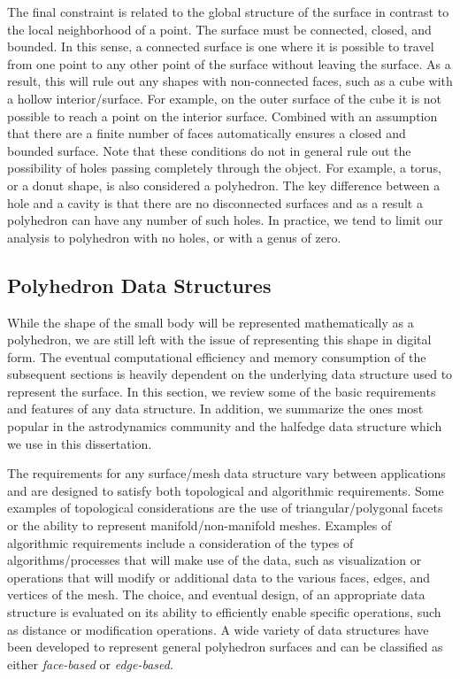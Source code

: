 The final constraint is related to the global structure of the surface in contrast to the local neighborhood of a point.
The surface must be connected, closed, and bounded.
In this sense, a connected surface is one where it is possible to travel from one point to any other point of the surface without leaving the surface. 
As a result, this will rule out any shapes with non-connected faces, such as a cube with a hollow interior/surface.
For example, on the outer surface of the cube it is not possible to reach a point on the interior surface. 
Combined with an assumption that there are a finite number of faces automatically ensures a closed and bounded surface. 
Note that these conditions do not in general rule out the possibility of holes passing completely through the object.
For example, a torus, or a donut shape, is also considered a polyhedron.
The key difference between a hole and a cavity is that there are no disconnected surfaces and as a result a polyhedron can have any number of such holes. 
In practice, we tend to limit our analysis to polyhedron with no holes, or with a genus of zero.

\subsection{Polyhedron Data Structures}\label{sec:polyhedron_data_structures}
While the shape of the small body will be represented mathematically as a polyhedron, we are still left with the issue of representing this shape in digital form. 
The eventual computational efficiency and memory consumption of the subsequent sections is heavily dependent on the underlying data structure used to represent the surface.
In this section, we review some of the basic requirements and features of any data structure.
In addition, we summarize the ones most popular in the astrodynamics community and the halfedge data structure which we use in this dissertation.

The requirements for any surface/mesh data structure vary between applications and are designed to satisfy both topological and algorithmic requirements.
Some examples of topological considerations are the use of triangular/polygonal facets or the ability to represent manifold/non-manifold meshes.
Examples of algorithmic requirements include a consideration of the types of algorithms/processes that will make use of the data, such as visualization or operations that will modify or additional data to the various faces, edges, and vertices of the mesh.
The choice, and eventual design, of an appropriate data structure is evaluated on its ability to efficiently enable specific operations, such as distance or modification operations.
A wide variety of data structures have been developed to represent general polyhedron surfaces and can be classified as either \textit{face-based} or \textit{edge-based}.

